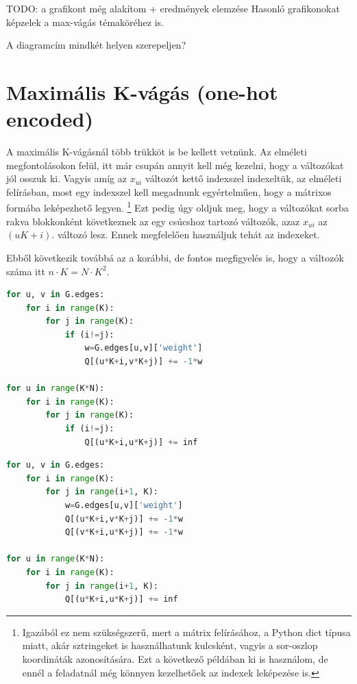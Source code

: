 TODO: a grafikont még alakítom + eredmények elemzése
Hasonló grafikonokat képzelek a max-vágás témaköréhez is.

A diagramcím mindkét helyen szerepeljen?

\section{Maximális K-vágás (one-hot encoded)}\label{sec:practiceOneHot}

A maximális K-vágásnál több trükköt is be kellett vetnünk. Az elméleti megfontolásokon felül, itt már csupán annyit kell még kezelni, hogy a változókat jól osszuk ki. Vagyis amíg az $x_{ui}$ változót kettő indexszel indexeltük, az elméleti felírásban, most egy indexszel kell megadnunk egyértelműen, hogy a mátrixos formába leképezhető legyen.
\footnote{Igazából ez nem szükségszerű, mert a mátrix felírásához, a Python dict típusa miatt, akár sztringeket is használhatunk kulcsként, vagyis a sor-oszlop koordináták azonosítására. Ezt a következő példában ki is használom, de ennél a feladatnál még könnyen kezelhetőek az indexek leképezése is.}
Ezt pedig úgy oldjuk meg, hogy a változókat sorba rakva blokkonként következnek az egy csúcshoz tartozó változók, azaz $x_{ui}$ az $(uK+i)$. változó lesz. Ennek megfelelően használjuk tehát az indexeket.

Ebből következik továbbá az a korábbi, de fontos megfigyelés is, hogy a változók száma itt $n \cdot K = N \cdot K^2$.

\begin{lstlisting}[language=python,caption=Max-K-cut QUBO (szimmetrikus mátrix), label=code:maxKCutQUBOSymmetric]
for u, v in G.edges:
	for i in range(K):
		for j in range(K):
			if (i!=j):
				w=G.edges[u,v]['weight']
				Q[(u*K+i,v*K+j)] += -1*w

for u in range(K*N):
	for i in range(K):
		for j in range(K):
			if (i!=j):
				Q[(u*K+i,u*K+j)] += inf 
\end{lstlisting}

\begin{lstlisting}[language=python,caption=Max-K-cut QUBO (háromszög mátrix),label=code:maxKCutQUBOTriangle]
for u, v in G.edges:
	for i in range(K):
		for j in range(i+1, K):
			w=G.edges[u,v]['weight']
			Q[(u*K+i,v*K+j)] += -1*w
			Q[(v*K+i,u*K+j)] += -1*w

for u in range(K*N):
	for i in range(K):
		for j in range(i+1, K):
			Q[(u*K+i,u*K+j)] += inf
\end{lstlisting}

